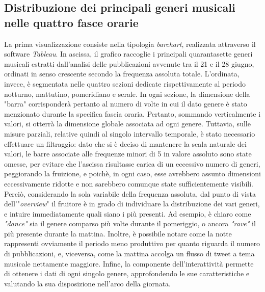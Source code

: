 \documentclass[12pt, a4paper, twocolumn]{article} %
\begin{document}
\subsection{Distribuzione dei principali generi musicali nelle quattro fasce orarie}
La prima visualizzazione consiste nella tipologia \textit{barchart}, realizzata attraverso il software \textit{Tableau}. In ascissa, il grafico raccoglie i principali quarantasette generi musicali estratti dall'analisi delle pubblicazioni avvenute tra il 21 e il 28 giugno, ordinati in senso crescente secondo la frequenza assoluta totale. L'ordinata, invece, è segmentata nelle quattro sezioni dedicate rispettivamente al periodo notturno, mattutino, pomeridiano e serale. In ogni sezione, la dimensione della "barra" corrisponderà pertanto al numero di volte in cui il dato genere è stato menzionato durante la specifica fascia oraria. Pertanto, sommando verticalmente i valori, si otterrà la dimensione globale associata ad ogni genere. Tuttavia, sulle misure parziali, relative quindi al singolo intervallo temporale, è stato necessario effettuare un filtraggio: dato che si è deciso di mantenere la scala naturale dei valori, le barre associate alle frequenze minori di 5 in valore assoluto sono state omesse, per evitare che l'ascissa risultasse carica di un eccessivo numero di generi, peggiorando la fruizione, e poichè, in ogni caso, esse avrebbero assunto dimensioni eccessivamente ridotte e non sarebbero comunque state sufficientemente visibili.\\
Perciò, considerando la sola variabile della frequenza assoluta, dal punto di vista dell'"\textit{overview}" il fruitore è in grado di individuare la distribuzione dei vari generi, e intuire immediatamente quali siano i più presenti. Ad esempio, è chiaro come \textit{"dance"} sia il genere comparso più volte durante il pomeriggio, o ancora \textit{"rave"} il più presente durante la mattina. Inoltre, è possibile notare come la notte rappresenti ovviamente il periodo meno produttivo per quanto riguarda il numero di pubblicazioni, e, viceversa, come la mattina accolga un flusso di tweet a tema musicale nettamente maggiore. Infine, la componente dell'interattività permette di ottenere i dati di ogni singolo genere, approfondendo le sue caratteristiche e valutando la sua disposizione nell'arco della giornata.\\
\end{document}
